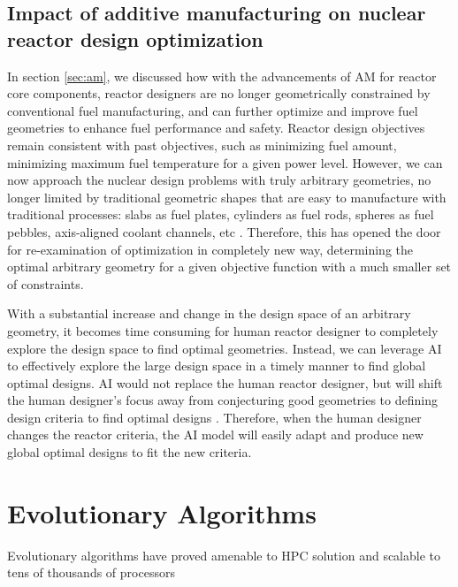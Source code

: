 \subsection{Impact of additive manufacturing on nuclear reactor design 
optimization}
In section \ref{sec:am}, we discussed how with the advancements of \gls{AM} 
for reactor core components, reactor designers are no longer geometrically 
constrained by conventional fuel manufacturing, and can further optimize and 
improve fuel geometries to enhance fuel performance and safety. 
Reactor design objectives remain consistent with past objectives, such as minimizing 
fuel amount, minimizing maximum fuel temperature for a given power level. 
However, we can now approach the nuclear design problems with truly arbitrary 
geometries, no longer limited by traditional geometric shapes that are 
easy to manufacture with traditional processes: slabs as fuel plates, cylinders 
as fuel rods, spheres as fuel pebbles, axis-aligned coolant channels, etc  
\cite{sobes_artificial_2020}.
Therefore, this has opened the door for re-examination of optimization in 
completely new way, determining the optimal arbitrary geometry for a given objective 
function \cite{sobes_artificial_2020} with a much smaller set of constraints. 

With a substantial increase and change in the design space of an arbitrary 
geometry, it becomes time consuming for human reactor designer to completely 
explore the design space to find optimal geometries. 
Instead, we can leverage \gls{AI} to effectively explore the large design space 
in a timely manner to find global optimal designs. 
\gls{AI} would not replace the human reactor designer, but will shift the 
human designer's focus away from conjecturing good geometries to defining 
design criteria to find optimal designs \cite{sobes_artificial_2020}. 
Therefore, when the human designer changes the reactor criteria, the \gls{AI} 
model will easily adapt and produce new global optimal designs to fit the new 
criteria.  

\section{Evolutionary Algorithms}
Evolutionary algorithms have proved amenable to \gls{HPC} solution and 
scalable to tens of thousands of processors \cite{kropaczek_constraint_2019}